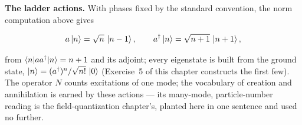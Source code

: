 \textbf{The ladder actions.} With phases fixed by the standard convention, the norm computation above gives
\begin{linenomath}
    \begin{equation}
        a\ket{n} = \sqrt{n}\,\ket{n-1},
        \qquad
        a^\dagger\ket{n} = \sqrt{n+1}\,\ket{n+1},
        \label{eq:ladder-action}
    \end{equation}
\end{linenomath}
from $\braket{n|aa^\dagger|n} = n+1$ and its adjoint; every eigenstate is built from the ground state, $\ket{n} = (a^\dagger)^n/\sqrt{n!}\,\ket{0}$ (Exercise~5 of this chapter constructs the first few). The operator $N$ counts excitations of one mode; the vocabulary of creation and annihilation is earned by these actions --- its many-mode, particle-number reading is the field-quantization chapter's, planted here in one sentence and used no further.


